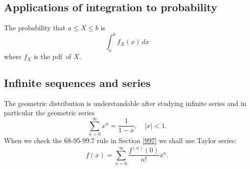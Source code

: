 \subsection{Applications of integration to probability}
The probability that $a\le X\le b$ is
\[
	\int_a^b f_X(x)\,dx
\]
where $f_X$ is the pdf~of $X$.


\subsection{Infinite sequences and series}
The geometric distribution is understandable after studying infinite series and in particular the geometric series
\[
	\sum_{n=0}^\infty x^n = \frac1{1-x},\quad |x|<1.
\]
When we check the 68-95-99.7 rule in Section \ref{997} we shall use Taylor series:
\[
f(x)=\sum_{n=0}^\infty \frac{f^{(n)}(0)}{n!}x^n.
\]